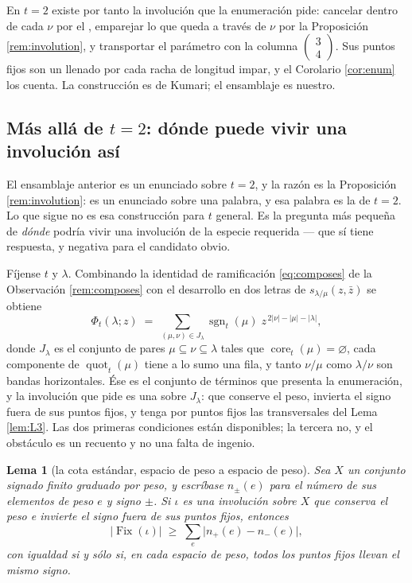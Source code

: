 \documentclass[11pt,reqno]{amsart}
\theoremstyle{plain}
\newtheorem{lemma}[theorem]{Lema}
\theoremstyle{definition}
\newcommand{\sgn}{\operatorname{sgn}}
\newcommand{\core}{\operatorname{core}}
\newcommand{\quot}{\operatorname{quot}}
\newcommand{\zb}{\bar z}
\newcommand{\Fix}{\operatorname{Fix}}
\begin{document}
En $t=2$ existe por tanto la involución que la enumeración pide: cancelar dentro de cada $\nu$ por
el \cite[Lema 2.18]{KumariThesis}, emparejar lo que queda a través de $\nu$ por la Proposición
\ref{rem:involution}, y transportar el parámetro con la columna
$\left(\begin{smallmatrix}3\\4\end{smallmatrix}\right)$. Sus puntos fijos son un llenado por cada
racha de longitud impar, y el Corolario \ref{cor:enum} los cuenta. La construcción es de Kumari; el
ensamblaje es nuestro.

\subsection{Más allá de \texorpdfstring{$t=2$}{t=2}: dónde puede vivir una involución así}\label{sec:lift}

El ensamblaje anterior es un enunciado sobre $t=2$, y la razón es la Proposición
\ref{rem:involution}: es un enunciado sobre una palabra, y esa palabra es la de $t=2$. Lo que sigue
no es esa construcción para $t$ general. Es la pregunta más pequeña de \emph{dónde} podría vivir una
involución de la especie requerida --- que sí tiene respuesta, y negativa para el candidato obvio.

Fíjense $t$ y $\lambda$. Combinando la identidad de ramificación \eqref{eq:composes} de la
Observación \ref{rem:composes} con el desarrollo en dos letras de $s_{\lambda/\mu}(z,\zb)$ se obtiene
\begin{equation}\label{eq:Jlambda}
\Phi_t(\lambda;z)\;=\;\sum_{(\mu,\nu)\in J_\lambda}\sgn_t(\mu)\;z^{\,2|\nu|-|\mu|-|\lambda|},
\end{equation}
donde $J_\lambda$ es el conjunto de pares $\mu\subseteq\nu\subseteq\lambda$ tales que
$\core_t(\mu)=\varnothing$, cada componente de $\quot_t(\mu)$ tiene a lo sumo una fila, y tanto
$\nu/\mu$ como $\lambda/\nu$ son bandas horizontales. Ése es el conjunto de términos que presenta la
enumeración, y la involución que pide es una sobre $J_\lambda$: que conserve el peso, invierta el
signo fuera de sus puntos fijos, y tenga por puntos fijos las transversales del Lema \ref{lem:L3}.
Las dos primeras condiciones están disponibles; la tercera no, y el obstáculo es un recuento y no
una falta de ingenio.

\begin{lemma}[la cota estándar, espacio de peso a espacio de peso]\label{lem:fixbound}
Sea $X$ un conjunto signado finito graduado por peso, y escríbase $n_\pm(e)$ para el número de sus
elementos de peso $e$ y signo $\pm$. Si $\iota$ es una involución sobre $X$ que conserva el peso e
invierte el signo fuera de sus puntos fijos, entonces
\[
\bigl|\Fix(\iota)\bigr|\;\ge\;\sum_e\bigl|n_+(e)-n_-(e)\bigr|,
\]
con igualdad si y sólo si, en cada espacio de peso, todos los puntos fijos llevan el mismo signo.
\end{lemma}
\end{document}

